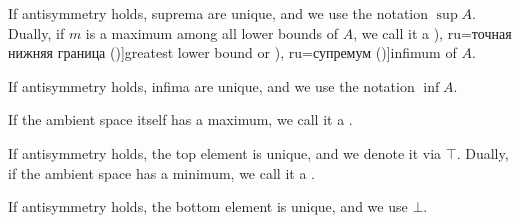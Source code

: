 \begin{definition}
\begin{thmenum}
\begin{TwoColumns}
      If antisymmetry holds, suprema are unique, and we use the notation \( \sup A \).
    \BeginSecondColumn
      Dually, if \( m \) is a maximum among all lower bounds of \( A \), we call it a \term[bg=точна долна граница (\cite[19]{Тагамлицки1971Диф}), ru=точная нижняя граница (\cite[]{Ляпин1960})]{greatest lower bound} or \term[bg=инфимум (\cite[10]{Проданов1982}), ru=супремум (\cite[]{Ляпин1960})]{infimum} of \( A \).

      If antisymmetry holds, infima are unique, and we use the notation \( \inf A \).
    \end{TwoColumns}

    \begin{TwoColumns}
      If the ambient space itself has a maximum, we call it a .

      If antisymmetry holds, the top element is unique, and we denote it via \( \top \).
    \BeginSecondColumn
      Dually, if the ambient space has a minimum, we call it a .

      If antisymmetry holds, the bottom element is unique, and we use \( \bot \).
    \end{TwoColumns}
  \end{thmenum}
\end{definition}

